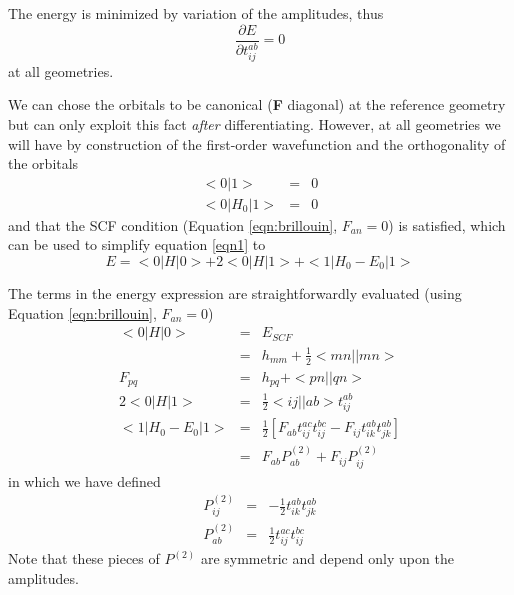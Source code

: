 \documentclass[fleqn,12pt]{article}
\newcommand{\half}{\frac{1}{2}}
\newcommand{\bra}{<\!}
\newcommand{\ket}{\!>}
\newcommand{\tijab}{{t_{ij}^{ab}}}
\newcommand{\Ptwo}{P^{(2)}}
\begin{document}
The energy is minimized by variation of the amplitudes, thus
\begin{equation}
\label{eqn:varia}
  \frac{\partial E}{\partial \tijab} = 0
\end{equation}
at all geometries.  

We can chose the orbitals to be canonical ({\bf F} diagonal) at the
reference geometry but can only exploit this fact {\em after}
differentiating.  However, at all geometries we will have by
construction of the first-order wavefunction and the orthogonality of
the orbitals
\begin{eqnarray*}
  \bra 0 | 1 \ket & = & 0 \\
  \bra 0 | H_0 | 1 \ket & = & 0 
\end{eqnarray*}
and that the SCF condition (Equation \ref{eqn:brillouin}, $F_{an}=0$) is
satisfied, which can be used to simplify equation \ref{eqn1} to
\begin{equation}
\label{eqn:energy}
  E = \bra 0 | H | 0 \ket + 2 \bra 0 | H | 1 \ket +
      \bra 1 | H_0 - E_0 | 1 \ket
\end{equation}

The terms in the energy expression are straightforwardly
evaluated (using Equation \ref{eqn:brillouin}, $F_{an}=0$)
\begin{eqnarray}
  \bra 0 | H | 0 \ket & = & E_{SCF}  \nonumber \\
  & = & h_{mm} + \half \bra mn||mn \ket \\
  F_{pq} & = & h_{pq} + \bra pn||qn \ket \\
\label{eqn:ri-change}
 2 \bra 0 | H | 1 \ket & = & \half \bra ij || ab \ket \tijab \\
 \bra 1 | H_0 - E_0 | 1 \ket & = & \half \left[
    F_{ab} t_{ij}^{ac} t_{ij}^{bc} - F_{ij}t_{ik}^{ab}t_{jk}^{ab}
  \right]  \nonumber \\
  & = & F_{ab}\Ptwo_{ab} + F_{ij}\Ptwo_{ij} 
\end{eqnarray}
in which we have defined
\begin{eqnarray}
\label{eqn:ptwoabij}
  \Ptwo_{ij} & = & -\half t_{ik}^{ab} t_{jk}^{ab} \\
  \Ptwo_{ab} & = & \half t_{ij}^{ac} t_{ij}^{bc} 
\end{eqnarray}
Note that these pieces of $\Ptwo$ are symmetric and depend only upon
the amplitudes.
\end{document}
